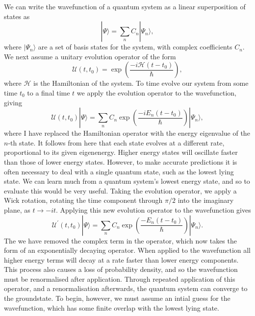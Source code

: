 We can write the wavefunction of a quantum system as a linear superposition of states as
\begin{equation}
     |\Psi \rangle = \displaystyle\sum\limits_{n} C_n |\Psi_n \rangle,
\end{equation}
where $| \Psi_n \rangle$ are a set of basis states for the system, with complex coefficients $C_n$. We next assume a unitary evolution operator of the form
\begin{equation}
    \mathscr{U}(t,t_0) = \exp\left(\frac{-i\mathcal{H}(t-t_0)}{\hbar}\right),
\end{equation}
where $\mathcal{H}$ is the Hamiltonian of the system. To time evolve our system from some time $t_0$ to a final time $t$ we apply the evolution operator to the wavefunction, giving
\begin{equation}
    \mathscr{U}(t,t_0)|\Psi \rangle = \displaystyle\sum\limits_{n} C_n \exp\left(\frac{-i{E_n}(t-t_0)}{\hbar}\right)|\Psi_n \rangle,
\end{equation}
where I have replaced the Hamiltonian operator with the energy eigenvalue of the $n$-th state. It follows from here that each state evolves at a different rate, proportional to its given eigenenergy. Higher energy states will oscillate faster than those of lower energy states. However, to make accurate predictions it is often necessary to deal with a single quantum state, such as the lowest lying state. We can learn much from a quantum system's lowest energy state, and so to evaluate this would be very useful. Taking the evolution operator, we apply a Wick rotation, rotating the time component through $\pi/2$ into the imaginary plane, as $t \rightarrow -it$. Applying this new evolution operator to the wavefunction gives
\begin{equation}
        \mathscr{U^{'}}(t,t_0)|\Psi \rangle = \displaystyle\sum\limits_{n} C_n \exp\left(\frac{-{E_n}(t-t_0)}{\hbar}\right)|\Psi_n \rangle.
\end{equation}
The we have removed the complex term in the operator, which now takes the form of an exponentially decaying operator. When applied to the wavefunction all higher energy terms will decay at a rate faster than lower energy components. This process also causes a loss of probability density, and so the wavefunction must be renormalised after application. Through repeated application of this operator, and a renormalisation afterwards, the quantum system can converge to the groundstate. To begin, however, we must assume an intial guess for the wavefunction, which has some finite overlap with the lowest lying state.











